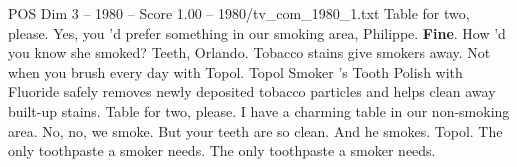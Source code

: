 \begin{textsample}{POS Dim 3 – 1980 – Score 1.00 – 1980/tv\_com\_1980\_1.txt}  \label{ex:f3_pos_059}
Table for two, please.
Yes, you 'd prefer something in our smoking area, Philippe. \textbf{Fine}.
How 'd you know she smoked?
Teeth, Orlando.
Tobacco stains give smokers away.
Not when you brush every day with Topol.
Topol Smoker 's Tooth Polish with Fluoride safely removes newly deposited tobacco particles and helps clean away built-up stains.
Table for two, please.
I have a charming table in our non-smoking area.
No, no, we smoke.
But your teeth are so clean.
And he smokes.
Topol.
The only toothpaste a smoker needs.
The only toothpaste a smoker needs.

\end{textsample}
